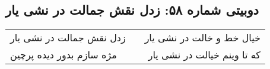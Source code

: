 \begin{center}
\section*{دوبیتی شماره ۵۸: زدل نقش جمالت در نشی یار}
\label{sec:058}
\begin{longtable}{l p{0.5cm} r}
زدل نقش جمالت در نشی یار
&&
خیال خط و خالت در نشی یار
\\
مژه سازم بدور دیده پرچین
&&
که تا وینم خیالت در نشی یار
\\
\end{longtable}
\end{center}
